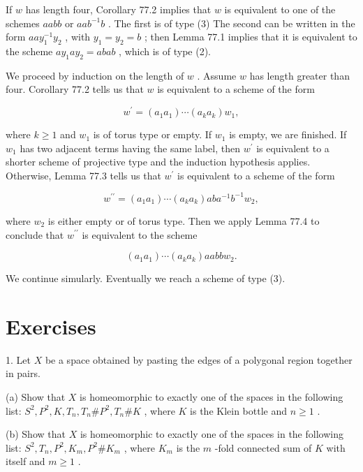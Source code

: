 \documentclass[10pt]{article}
\begin{document}
If \(w\) has length four, Corollary 77.2 implies that \(w\) is equivalent to one of the schemes \({aabb}\) or \({aa}{b}^{-1}b\) . The first is of type (3) The second can be written in the form \({aa}{y}_{1}^{-1}{y}_{2}\) , with \({y}_{1} = {y}_{2} = b\) ; then Lemma 77.1 implies that it is equivalent to the scheme \(a{y}_{1}a{y}_{2} = {abab}\) , which is of type (2).

We proceed by induction on the length of \(w\) . Assume \(w\) has length greater than four. Corollary 77.2 tells us that \(w\) is equivalent to a scheme of the form

\[
{w}^{\prime } = \left( {{a}_{1}{a}_{1}}\right) \cdots \left( {{a}_{k}{a}_{k}}\right) {w}_{1},
\]

where \(k \geq  1\) and \({w}_{1}\) is of torus type or empty. If \({w}_{1}\) is empty, we are finished. If \({w}_{1}\) has two adjacent terms having the same label, then \({w}^{\prime }\) is equivalent to a shorter scheme of projective type and the induction hypothesis applies. Otherwise, Lemma 77.3 tells us that \({w}^{\prime }\) is equivalent to a scheme of the form

\[
{w}^{\prime \prime } = \left( {{a}_{1}{a}_{1}}\right) \cdots \left( {{a}_{k}{a}_{k}}\right) {ab}{a}^{-1}{b}^{-1}{w}_{2},
\]

where \({w}_{2}\) is either empty or of torus type. Then we apply Lemma 77.4 to conclude that \({w}^{\prime \prime }\) is equivalent to the scheme

\[
\left( {{a}_{1}{a}_{1}}\right) \cdots \left( {{a}_{k}{a}_{k}}\right) {aabb}{w}_{2}.
\]

We continue simularly. Eventually we reach a scheme of type (3).

\section*{Exercises}

1. Let \(X\) be a space obtained by pasting the edges of a polygonal region together in pairs.

(a) Show that \(X\) is homeomorphic to exactly one of the spaces in the following list: \({S}^{2},{P}^{2},K,{T}_{n},{T}_{n}\# {P}^{2},{T}_{n}\# K\) , where \(K\) is the Klein bottle and \(n \geq  1\) .

(b) Show that \(X\) is homeomorphic to exactly one of the spaces in the following list: \({S}^{2},{T}_{n},{P}^{2},{K}_{m},{P}^{2}\# {K}_{m}\) , where \({K}_{m}\) is the \(m\) -fold connected sum of \(K\) with itself and \(m \geq  1\) .
\end{document}
